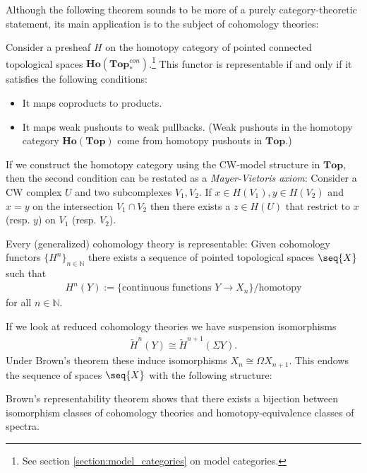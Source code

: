     Although the following theorem sounds to be more of a purely category-theoretic statement, its main application is to the subject of cohomology theories:
    \begin{theorem}\label{topology:brown}
        Consider a presheaf $H$ on the homotopy category of pointed connected topological spaces $\mathbf{Ho}(\mathbf{Top}^{con}_*)$.\footnote{See section \ref{section:model_categories} on model categories.} This functor is representable if and only if it satisfies the following conditions:
        \begin{itemize}
            \item It maps coproducts to products.
            \item It maps weak pushouts to weak pullbacks. (Weak pushouts in the homotopy category $\mathbf{Ho}(\mathbf{Top})$ come from homotopy pushouts in $\mathbf{Top}$.)
        \end{itemize}
    \end{theorem}
    \begin{remark}
        If we construct the homotopy category using the CW-model structure in $\mathbf{Top}$, then the second condition can be restated as a \textit{Mayer-Vietoris axiom}: Consider a CW complex $U$ and two subcomplexes $V_1, V_2$. If $x\in H(V_1), y\in H(V_2)$ and $x=y$ on the intersection $V_1\cap V_2$ then there exists a $z\in H(U)$ that restrict to $x$ (resp. $y$) on $V_1$ (resp. $V_2$).
    \end{remark}
    \begin{result}
        Every (generalized) cohomology theory is representable: Given cohomology functors $\{H^n\}_{n\in\mathbb{N}}$ there exists a sequence of pointed topological spaces $\seq{X}$ such that
        \begin{gather}
            H^n(Y) := \{\text{continuous functions } Y\rightarrow X_n\}/\text{homotopy}
        \end{gather}
        for all $n\in\mathbb{N}$.
    \end{result}

    If we look at reduced cohomology theories we have suspension isomorphisms
    \begin{gather}
        \widetilde{H}^n(Y)\cong\widetilde{H}^{n+1}(\Sigma Y).
    \end{gather}
    Under Brown's theorem these induce isomorphisms $X_n\cong\Omega X_{n+1}$. This endows the sequence of spaces $\seq{X}$ with the following structure:
    \begin{property}
        Brown's representability theorem shows that there exists a bijection between isomorphism classes of cohomology theories and homotopy-equivalence classes of spectra.
    \end{property}

